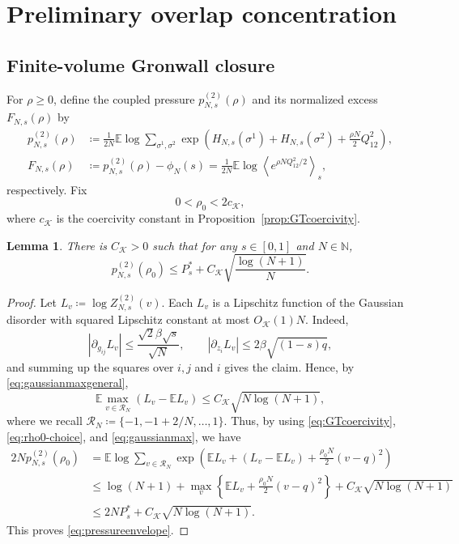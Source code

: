 \documentclass[11pt]{article}
\newtheorem{lemma}[theorem]{Lemma}
\numberwithin{equation}{section}
\newcommand{\E}{\mathbb{E}}
\newcommand{\1}{\mathbf 1}
\newcommand{\cK}{\mathcal K}
\newcommand{\braket}[1]{\left\langle #1\right\rangle}
\begin{document}
\section{Preliminary overlap concentration}\label{sec:concentration}

\subsection{Finite-volume Gronwall closure}\label{subsec:gronwall}

For $\rho\ge0$, define the coupled pressure $p^{(2)}_{N,s}(\rho)$ and its normalized excess $F_{N,s}(\rho)$ by
\begin{align}
 p^{(2)}_{N,s}(\rho)
 &\coloneqq
 \frac1{2N}\E\log
 \sum_{\sigma^1,\sigma^2}
 \exp\left(
 H_{N,s}(\sigma^1)+H_{N,s}(\sigma^2)
 +\frac{\rho N}{2}Q_{12}^2\right),
 \label{eq:quadraticpressure}\\
 F_{N,s}(\rho)
 &\coloneqq
 p^{(2)}_{N,s}(\rho)-\phi_N(s)
 =
 \frac1{2N}\E\log
 \braket{e^{\rho NQ_{12}^2/2}}_s ,
 \label{eq:normalizedcoupling}
\end{align}
respectively.
Fix
\begin{equation}
 0<\rho_0<2c_{\cK},
 \label{eq:rho0-choice}
\end{equation}
where $c_{\cK}$ is the coercivity constant in
Proposition~\ref{prop:GTcoercivity}.

\begin{lemma}
\label{lem:sublinearpressure}
There is $C_\cK>0$ such that for any $s\in [0,1]$ and $N\in \mathbb N$, 
\begin{equation}
 p^{(2)}_{N,s}(\rho_0)\le P_s^*+C_{\cK} 
 \sqrt{\frac{\log(N+1)}N}.
 \label{eq:pressureenvelope}
\end{equation}

\end{lemma}

\begin{proof}
Let $L_v\coloneqq\log Z^{(2)}_{N,s}(v)$.  Each $L_v$ is a Lipschitz function
of the Gaussian disorder with squared Lipschitz constant at most
$O_{\cK}(1)N$.  Indeed,
\[
 \left|\partial_{g_{ij}}L_v\right|
 \le\frac{\sqrt2\beta\sqrt s}{\sqrt N},\qquad
 \left|\partial_{z_i}L_v\right|
 \le2\beta\sqrt{(1-s)q},
\]
and summing up the squares over $i,j$ and $i$ gives the claim.  Hence, by \eqref{eq:gaussianmaxgeneral}, 
\begin{equation}
 \E\max_{v\in\mathcal R_N}(L_v-\E L_v)
 \le C_{\cK} \sqrt{N\log(N+1)},
 \label{eq:gaussianmax}
\end{equation}
where we recall $\mathcal R_N \coloneqq \{ -1,-1+2/N,\ldots,1\}$.
Thus, by using \eqref{eq:GTcoercivity}, \eqref{eq:rho0-choice}, and \eqref{eq:gaussianmax}, we have
\begin{align*}
 2Np^{(2)}_{N,s}(\rho_0)
 &=
 \E\log\sum_{v\in\mathcal R_N}
 \exp\left(\E L_v + (L_v - \E L_v ) +\frac{\rho_0N}{2}(v-q)^2\right)\\
 &\le
 \log(N+1)+
 \max_v\left\{\E L_v+\frac{\rho_0N}{2}(v-q)^2\right\}
 +C_{\cK}\sqrt{N\log(N+1)}\\
 &\le2NP_s^*+C_{\cK} 
 \sqrt{{N\log(N+1)}}.
\end{align*}
This proves \eqref{eq:pressureenvelope}.
\end{proof}
\end{document}
